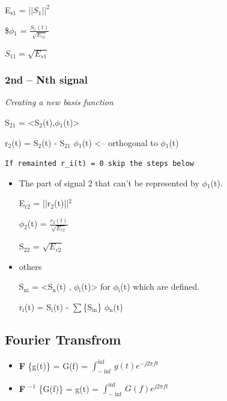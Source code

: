\documentclass[11pt]{article}
\begin{document}
E$_{\text{s1}}$ = $||S_{1}||^2$

\$$\phi$$_{\text{1}}$ = $\frac{S_1(t)}{\sqrt{E_{s1}}}$

$S_{11} = \sqrt{E_{s1}}$

\subsubsection{2nd -- Nth signal}
\label{sec-4-3-2}
\emph{Creating a new basis function}

S$_{\text{21}}$ = <S$_{\text{2}}$(t),$\phi$$_{\text{1}}$(t)>



r$_{\text{2}}$(t) = S$_{\text{2}}$(t) - S$_{\text{21}}$ $\phi$$_{\text{1}}$(t) <-- orthogonal to $\phi$$_{\text{1}}$(t)

\texttt{If remainted r\_i(t) = 0 skip the steps below}

\begin{itemize}
\item The part of signal 2 that can't be represented by $\phi$$_{\text{1}}$(t).

E$_{\text{r2}}$ = ||r$_{\text{2}}$(t)||$^{\text{2}}$

$\phi$$_{\text{2}}$(t) = $\frac{r_2(t)}{\sqrt{E_{r2}}}$

S$_{\text{22}}$ = $\sqrt{E_{r2}}$
\item others

S$_{\text{ni}}$ = <S$_{\text{n}}$(t) , $\phi$$_{\text{i}}$(t)> for $\phi$$_{\text{i}}$(t) which are defined.

r$_{\text{i}}$(t) = S$_{\text{i}}$(t) - $\sum$\{S$_{\text{in}}$\} $\phi$$_{\text{n}}$(t)
\end{itemize}

\subsection{Fourier Transfrom}
\label{sec-4-4}

\begin{itemize}
\item \textbf{F} \{g(t)\} = G(f) = $\int_{-\inf}^{\inf} g(t) e^{-j2\pi ft}$

\item \textbf{F} $^{-1}$ \{G(f)\} = g(t) = $\int_{-\inf}^{\inf} G(f) e^{j2\pi ft}$
\end{itemize}
\end{document}
